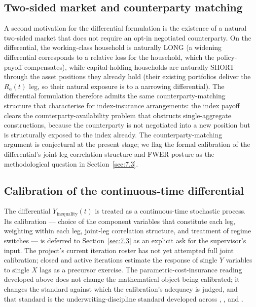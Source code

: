 \subsection{Two-sided market and counterparty matching}

A second motivation for the differential formulation is the existence of
a natural two-sided market that does not require an opt-in negotiated
counterparty. On the differential, the working-class household is
naturally LONG (a widening differential corresponds to a relative loss
for the household, which the policy-payoff compensates), while
capital-holding households are naturally SHORT through the asset
positions they already hold (their existing portfolios deliver the
\(R_a(t)\) leg, so their natural exposure is to a narrowing
differential). The differential formulation therefore admits the same
counterparty-matching structure that \citet{carter_etal_2017} characterise
for index-insurance arrangements: the index payoff clears the
counterparty-availability problem that obstructs single-aggregate
constructions, because the counterparty is not negotiated into a new
position but is structurally exposed to the index already. The
counterparty-matching argument is conjectural at the present stage; we
flag the formal calibration of the differential's joint-leg correlation
structure and FWER posture as the methodological question in
Section~\ref{sec:7.3}.

\subsection{Calibration of the continuous-time differential}

The differential \(Y_{\text{inequality}}(t)\) is treated as a
continuous-time stochastic process. Its calibration --- choice of the
component variables that constitute each leg, weighting within each leg,
joint-leg correlation structure, and treatment of regime switches --- is
deferred to Section~\ref{sec:7.3} as an explicit ask for the supervisor's
input. The project's current iteration roster has not yet attempted full
joint calibration; closed and active iterations estimate the response of
single \(Y\) variables to single \(X\) lags as a precursor exercise. The
parametric-cost-insurance reading developed above does not change the
mathematical object being calibrated; it changes the standard against
which the calibration's adequacy is judged, and that standard is the
underwriting-discipline standard developed across
\citet{carter_etal_2017}, \citet{mahul_stutley_2010}, and
\citet{clarke_2016}.
